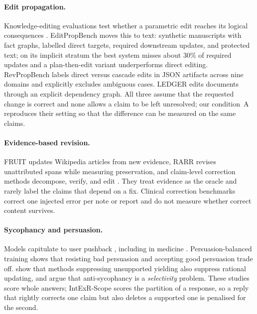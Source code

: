 \paragraph{Edit propagation.}
Knowledge-editing evaluations test whether a parametric edit reaches its logical consequences \citep{zhong2023mquake,cohen2024ripple,onoe2023entities}.
EditPropBench \citep{kruthof2026editpropbench} moves this to text: synthetic manuscripts with fact graphs, labelled direct targets, required downstream updates, and protected text; on its implicit stratum the best system misses about 30\% of required updates and a plan-then-edit variant underperforms direct editing.
RevPropBench \citep{kikuta2026revpropbench} labels direct versus cascade edits in JSON artifacts across nine domains and explicitly excludes ambiguous cases. LEDGER \citep{ledger2026} edits documents through an explicit dependency graph.
All three assume that the requested change is correct and none allows a claim to be left unresolved; our condition~A reproduces their setting so that the difference can be measured on the same claims.

\paragraph{Evidence-based revision.}
FRUIT \citep{logan2022fruit} updates Wikipedia articles from new evidence, RARR \citep{gao2023rarr} revises unattributed spans while measuring preservation, and claim-level correction methods decompose, verify, and edit \citep{thorne2021fec,dhuliawala2024cove,mishra2024fava}.
They treat evidence as the oracle and rarely label the claims that depend on a fix. Clinical correction benchmarks \citep{benabacha2025medec,zou2025corbenchx} correct one injected error per note or report and do not measure whether correct content survives.

\paragraph{Sycophancy and persuasion.}
Models capitulate to user pushback \citep{sharma2024sycophancy,laban2023flipflop}, including in medicine \citep{fanous2025syceval,xiao2026medstress}. Persuasion-balanced training \citep{stengeleskin2025pbt} shows that resisting bad persuasion and accepting good persuasion trade off. \citet{ma2026selectivity} show that methods suppressing unsupported yielding also suppress rational updating, and argue that anti-sycophancy is a \emph{selectivity} problem. These studies score whole answers; IntExR-Scope scores the partition of a response, so a reply that rightly corrects one claim but also deletes a supported one is penalised for the second.


